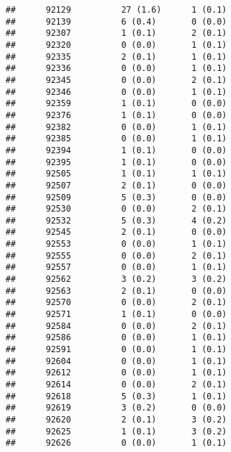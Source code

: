 \documentclass[]{article}
\begin{document}
\begin{verbatim}
##      92129          27 (1.6)      1 (0.1)                        
##      92139          6 (0.4)       0 (0.0)                        
##      92307          1 (0.1)       2 (0.1)                        
##      92320          0 (0.0)       1 (0.1)                        
##      92335          2 (0.1)       1 (0.1)                        
##      92336          0 (0.0)       1 (0.1)                        
##      92345          0 (0.0)       2 (0.1)                        
##      92346          0 (0.0)       1 (0.1)                        
##      92359          1 (0.1)       0 (0.0)                        
##      92376          1 (0.1)       0 (0.0)                        
##      92382          0 (0.0)       1 (0.1)                        
##      92385          0 (0.0)       1 (0.1)                        
##      92394          1 (0.1)       0 (0.0)                        
##      92395          1 (0.1)       0 (0.0)                        
##      92505          1 (0.1)       1 (0.1)                        
##      92507          2 (0.1)       0 (0.0)                        
##      92509          5 (0.3)       0 (0.0)                        
##      92530          0 (0.0)       2 (0.1)                        
##      92532          5 (0.3)       4 (0.2)                        
##      92545          2 (0.1)       0 (0.0)                        
##      92553          0 (0.0)       1 (0.1)                        
##      92555          0 (0.0)       2 (0.1)                        
##      92557          0 (0.0)       1 (0.1)                        
##      92562          3 (0.2)       3 (0.2)                        
##      92563          2 (0.1)       0 (0.0)                        
##      92570          0 (0.0)       2 (0.1)                        
##      92571          1 (0.1)       0 (0.0)                        
##      92584          0 (0.0)       2 (0.1)                        
##      92586          0 (0.0)       1 (0.1)                        
##      92591          0 (0.0)       1 (0.1)                        
##      92604          0 (0.0)       1 (0.1)                        
##      92612          0 (0.0)       1 (0.1)                        
##      92614          0 (0.0)       2 (0.1)                        
##      92618          5 (0.3)       1 (0.1)                        
##      92619          3 (0.2)       0 (0.0)                        
##      92620          2 (0.1)       3 (0.2)                        
##      92625          1 (0.1)       3 (0.2)                        
##      92626          0 (0.0)       1 (0.1)                        

\end{verbatim}
\end{document}
